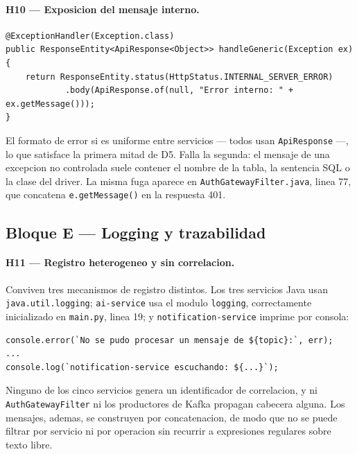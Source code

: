 \documentclass[10pt,a4paper]{article}
\begin{document}
\paragraph{H10 --- Exposicion del mensaje interno.}
\begin{lstlisting}[caption={\texttt{svc-principal/.../web/GlobalExceptionHandler.java}, lineas 37--41},firstnumber=37]
@ExceptionHandler(Exception.class)
public ResponseEntity<ApiResponse<Object>> handleGeneric(Exception ex) {
    return ResponseEntity.status(HttpStatus.INTERNAL_SERVER_ERROR)
            .body(ApiResponse.of(null, "Error interno: " + ex.getMessage()));
}
\end{lstlisting}

El formato de error si es uniforme entre servicios --- todos usan \texttt{ApiResponse} ---,
lo que satisface la primera mitad de D5. Falla la segunda: el mensaje de una excepcion no
controlada suele contener el nombre de la tabla, la sentencia SQL o la clase del driver. La
misma fuga aparece en \texttt{AuthGatewayFilter.java}, linea 77, que concatena
\texttt{e.getMessage()} en la respuesta 401.

\subsection{Bloque E --- Logging y trazabilidad}

\paragraph{H11 --- Registro heterogeneo y sin correlacion.}
Conviven tres mecanismos de registro
distintos. Los tres servicios Java usan \texttt{java.util.logging}; \texttt{ai-service} usa el modulo \texttt{logging}, correctamente inicializado en
\texttt{main.py}, linea 19; y \texttt{notification-service} imprime por consola:

\begin{lstlisting}[caption={\texttt{notification-service/src/kafkaConsumer.js}, lineas 51 y 56},firstnumber=51]
console.error(`No se pudo procesar un mensaje de ${topic}:`, err);
...
console.log(`notification-service escuchando: ${...}`);
\end{lstlisting}

Ninguno de los cinco servicios genera un identificador de correlacion, y ni
\texttt{AuthGatewayFilter} ni los productores de Kafka propagan cabecera alguna. Los
mensajes, ademas, se construyen por concatenacion, de modo que no se puede filtrar por
servicio ni por operacion sin recurrir a expresiones regulares sobre texto libre.
\end{document}
